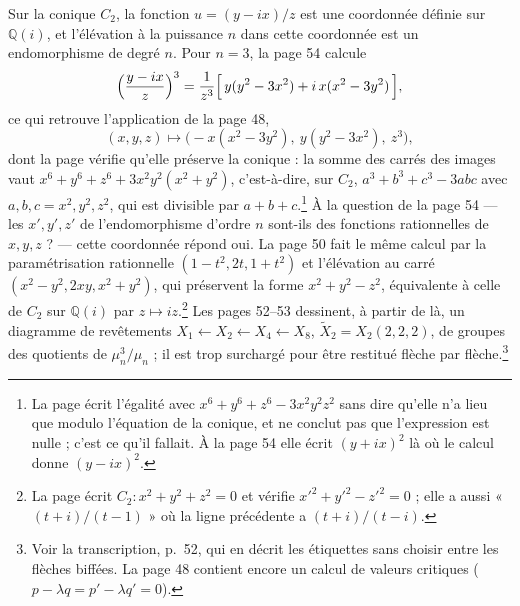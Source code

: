\documentclass[11pt,a4paper]{article}
\begin{document}
Sur la conique $C_{2}$, la fonction $u = (y - ix)/z$ est une coordonnée définie
sur $\mathbb{Q}(i)$, et l'élévation à la puissance $n$ dans cette coordonnée est
un endomorphisme de degré $n$. Pour $n = 3$, la page 54 calcule
\[
\Bigl(\frac{y - ix}{z}\Bigr)^{3} = \frac{1}{z^{3}}\Bigl[\,y(y^{2} - 3x^{2}) +
i\, x(x^{2} - 3y^{2})\,\Bigr],
\]
ce qui retrouve l'application de la page 48,
\[
(x, y, z) \longmapsto \bigl(-x(x^{2} - 3y^{2}),\ y(y^{2} - 3x^{2}),\ z^{3}\bigr),
\]
dont la page vérifie qu'elle préserve la conique : la somme des carrés des
images vaut $x^{6} + y^{6} + z^{6} + 3x^{2}y^{2}(x^{2} + y^{2})$, c'est-à-dire, sur
$C_{2}$, $a^{3} + b^{3} + c^{3} - 3abc$ avec $a, b, c = x^{2}, y^{2}, z^{2}$, qui est
divisible par $a + b + c$.\footnote{La page écrit l'égalité avec $x^{6} + y^{6} +
z^{6} - 3x^{2}y^{2}z^{2}$ sans dire qu'elle n'a lieu que modulo l'équation de la
conique, et ne conclut pas que l'expression est nulle ; c'est ce qu'il fallait.
À la page 54 elle écrit $(y + ix)^{2}$ là où le calcul donne $(y - ix)^{2}$.} À la
question de la page 54 --- les $x', y', z'$ de l'endomorphisme d'ordre $n$
sont-ils des fonctions rationnelles de $x, y, z$ ? --- cette coordonnée répond
oui. La page 50 fait le même calcul par la paramétrisation rationnelle
$(1 - t^{2}, 2t, 1 + t^{2})$ et l'élévation au carré $(x^{2} - y^{2}, 2xy, x^{2} +
y^{2})$, qui préservent la forme $x^{2} + y^{2} - z^{2}$, équivalente à celle de
$C_{2}$ sur $\mathbb{Q}(i)$ par $z \mapsto iz$.\footnote{La page écrit $C_{2} :
x^{2} + y^{2} + z^{2} = 0$ et vérifie $x'^{2} + y'^{2} - z'^{2} = 0$ ; elle a
aussi « $(t + i)/(t - 1)$ » où la ligne précédente a $(t+i)/(t-i)$.} Les
pages 52--53 dessinent, à partir de là, un diagramme de revêtements $X_{1}
\leftarrow X_{2} \leftarrow X_{4} \leftarrow X_{8}$, $\widetilde{X}_{2} =
X_{2}(2, 2, 2)$, de groupes des quotients de $\mu_{n}^{3}/\mu_{n}$ ; il est trop
surchargé pour être restitué flèche par flèche.\footnote{Voir la transcription,
p.~52, qui en décrit les étiquettes sans choisir entre les flèches biffées.
La page 48 contient encore un calcul de valeurs critiques
($p - \lambda q = p' - \lambda q' = 0$).}
\begin{center}
\end{center}
\end{document}
